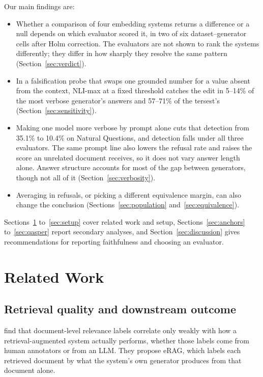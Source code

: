 \documentclass[11pt]{article}
\begin{document}
Our main findings are:
\begin{itemize}
\item Whether a comparison of four embedding systems returns a difference or a null depends on which evaluator scored it, in two of six dataset--generator cells after Holm correction. The evaluators are not shown to rank the systems differently; they differ in how sharply they resolve the same pattern (Section~\ref{sec:verdict}).
\item In a falsification probe that swaps one grounded number for a value absent from the context, NLI-max at a fixed threshold catches the edit in 5--14\% of the most verbose generator's answers and 57--71\% of the tersest's (Section~\ref{sec:sensitivity}).
\item Making one model more verbose by prompt alone cuts that detection from 35.1\% to 10.4\% on Natural Questions, and detection falls under all three evaluators. The same prompt line also lowers the refusal rate and raises the score an unrelated document receives, so it does not vary answer length alone. Answer structure accounts for most of the gap between generators, though not all of it (Section~\ref{sec:verbosity}).
\item Averaging in refusals, or picking a different equivalence margin, can also change the conclusion (Sections~\ref{sec:population} and~\ref{sec:equivalence}).
\end{itemize}
Sections~\ref{sec:related} to~\ref{sec:setup} cover related work and setup, Sections~\ref{sec:anchors} to~\ref{sec:qasper} report secondary analyses, and Section~\ref{sec:discussion} gives recommendations for reporting faithfulness and choosing an evaluator.

 



\section{Related Work}
\label{sec:related}


\subsection{Retrieval quality and downstream outcome}
\label{sec:rq-downstream}

\citet{salemi-zamani-2024} find that document-level relevance labels correlate only weakly with how a retrieval-augmented system actually performs, whether those labels come from human annotators or from an LLM. They propose eRAG, which labels each retrieved document by what the system's own generator produces from that document alone.
\end{document}
